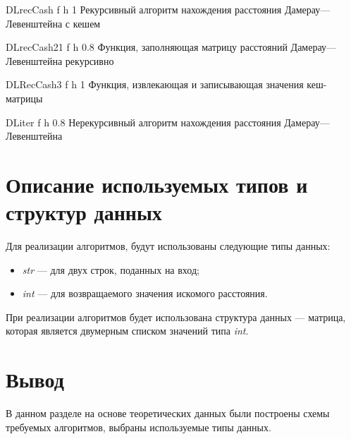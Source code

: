 {DLrecCash} %
{f} %
{h} %
{1\textwidth} %
{Рекурсивный алгоритм нахождения расстояния Дамерау---Левенштейна с кешем} %

{DLrecCash21} %
{f} %
{h} %
{0.8\textwidth} %
{Функция, заполняющая матрицу расстояний Дамерау---Левенштейна рекурсивно} %

{DLRecCash3} %
{f} %
{h} %
{1\textwidth} %
{Функция, извлекающая и записывающая значения кеш-матрицы} %


{DLiter} %
{f} %
{h} %
{0.8\textwidth} %
{Нерекурсивный алгоритм нахождения расстояния Дамерау---Левенштейна} %

\clearpage

\section{Описание используемых типов и структур данных}

Для реализации алгоритмов, будут использованы следующие типы данных:
\begin{itemize}
	\item \textit{str} --- для двух строк, поданных на вход;
	\item \textit{int} --- для возвращаемого значения искомого расстояния.
\end{itemize}

При реализации алгоритмов будет использована структура данных --- матрица, которая является двумерным списком значений типа \textit{int}.


\section*{Вывод}

В данном разделе на основе теоретических данных были построены схемы требуемых алгоритмов, выбраны используемые типы данных.
